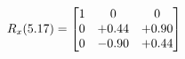 \documentclass[preview]{standalone}
\begin{document}
\begin{align*}
\special{dvisvgm:raw <g id='unique000'>}R_{x}(5.17) = \begin{bmatrix}1 & 0 & 0 \\0 & +0.44 & +0.90 \\0 & -0.90 & +0.44\end{bmatrix}\special{dvisvgm:raw </g>}
\end{align*}
\end{document}
